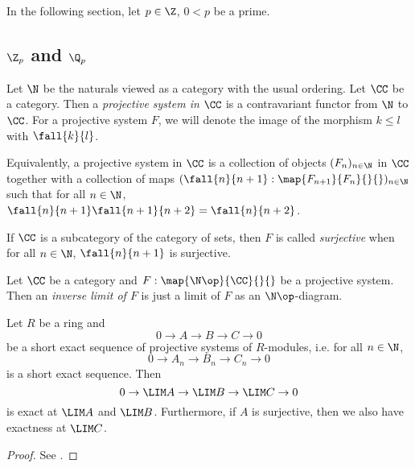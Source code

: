 In the following section, let $p \in \Z$, $0 < p$ be a prime. 

\subsection{\texorpdfstring{$\Z_p$ and $\Q_p$}{TEXT}}

\begin{dfn}
  
  Let $\N$ be the naturals viewed as a category with the usual ordering. 
  Let $\CC$ be a category. 
  Then a \emph{projective system in $\CC$} is a contravariant functor 
  from $\N$ to $\CC$. 
  For a projective system $F$, 
  we will denote the image of the morphism $k \leq l$ with $\fall{k}{l}$. 

  Equivalently, 
  a projective system in $\CC$ is 
  a collection of objects $(F_n)_{n\in\N}$ in $\CC$ together with
  a collection of maps $(\fall{n}{n+1} : \map{F_{n+1}}{F_n}{}{})_{n\in \N}$
  such that for all $n \in \N$, $\fall{n}{n+1}\fall{n+1}{n+2} = \fall{n}{n+2}$.

  If $\CC$ is a subcategory of the category of sets, 
  then $F$ is called \emph{surjective} when 
  for all $n \in \N$, $\fall{n}{n+1}$ is surjective. 
\end{dfn}

\begin{dfn}
  
  Let $\CC$ be a category and $F : \map{\N\op}{\CC}{}{}$ be a projective system.
  Then an \emph{inverse limit of $F$} is just 
  a limit of $F$ as an $\N\op$-diagram.

\end{dfn}

\begin{prop}
  
  Let $R$ be a ring and \[
    0 \to A \to B \to C \to 0
  \]
  be a short exact sequence of projective systems of $R$-modules,
  i.e. for all $n \in \N$, 
  \[
    0 \to A_n \to B_n \to C_n \to 0
  \]
  is a short exact sequence. 
  Then \[
    0 \to \LIM A \to \LIM B \to \LIM C \to 0
  \]
  is exact at $\LIM A$ and $\LIM B$. 
  Furthermore, if $A$ is surjective, 
  then we also have exactness at $\LIM C$. 

\end{prop}
\begin{proof}
  See . 
\end{proof}

